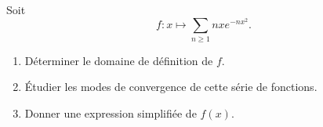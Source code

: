 \begin{enonce}
\begin{exercise}[ID={RMS135 E1461},subtitle={IMT MP 2024},tags={},difficulty={}]

Soit
\begin{equation*}
f : x \mapsto \sum_{n \geq 1} n x e^{-n x^2}.
\end{equation*}

\begin{enumerate}
  \item Déterminer le domaine de définition de $f$.
  \item Étudier les modes de convergence de cette série de fonctions.
  \item Donner une expression simplifiée de $f(x)$.
\end{enumerate}

\end{exercise}
\begin{solution}
\end{solution}
\end{enonce}
